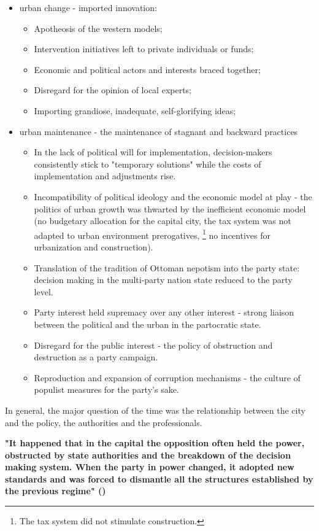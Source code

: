 \documentclass[11pt]{report}
\begin{document}
{{{{\begin{itemize}
\item urban change - imported innovation:
\begin{itemize}
\item Apotheosis of the western models;
\item Intervention initiatives left to private individuals or funds; 
\item Economic and political actors and interests braced together;
\item Disregard for the opinion of local experts;
\item Importing grandiose, inadequate, self-glorifying ideas; %
\end{itemize}

\item urban maintenance - the maintenance of stagnant and backward practices
\\
\begin{itemize}
\item In the lack of political will for implementation, decision-makers consistently stick to "temporary solutions" while the costs of implementation and adjustments rise.
\item Incompatibility of political ideology and the economic model at play - the politics of urban growth was thwarted by the inefficient economic model (no budgetary allocation for the capital city,
the tax system was not adapted to urban environment prerogatives,
\footnote{The tax system did not stimulate construction.}
no incentives for urbanization and construction).
\item Translation of the tradition of Ottoman nepotism into the party state: decision making in the multi-party nation state reduced to the party level.
\item Party interest held supremacy over any other interest - strong liaison between the political and the urban in the partocratic state.
\item Disregard for the public interest - the policy of obstruction and destruction as a party campaign.
\item Reproduction and expansion of corruption mechanisms - the culture of populist measures for the party's sake. 
\end{itemize}
\end{itemize}

In general, the major question of the time was the relationship between the city and the policy, the authorities and the professionals.

\textbf{"It happened that in the capital the opposition often held the power, obstructed by state authorities and the breakdown of the decision making system. When the party in power changed, it adopted new standards and was forced to dismantle all the structures established by the previous regime" (\href{Dubravka}{\citealt{stojanovic_kontroverze_2015}})}

}}}}
\end{document}
